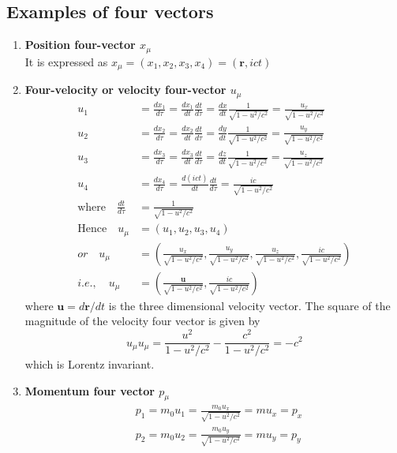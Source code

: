 \subsection{Examples of four vectors}
\begin{enumerate}
	\item \textbf{ Position four-vector $ x_{\mu}$}\\
	It is expressed as $x_{\mu}=\left(x_{1}, x_{2}, x_{3}, x_{4}\right)=(\mathbf{r}, i c t)$
	\item \textbf{ Four-velocity or velocity four-vector $u_{\mu}$}\\
	\begin{align*}
		u_{1}&=\frac{d x_{1}}{d \tau}=\frac{d x_{1}}{d t} \frac{d t}{d \tau}=\frac{d x}{d t} \frac{1}{\sqrt{1-u^{2} / c^{2}}}=\frac{u_{x}}{\sqrt{1-u^{2} / c^{2}}} \\
		u_{2}&=\frac{d x_{2}}{d \tau}=\frac{d x_{2}}{d t} \frac{d t}{d \tau}=\frac{d y}{d t} \frac{1}{\sqrt{1-u^{2} / c^{2}}}=\frac{u_{y}}{\sqrt{1-u^{2} / c^{2}}} \\
		u_{3}&=\frac{d x_{3}}{d \tau}=\frac{d x_{3}}{d t} \frac{d t}{d \tau}=\frac{d z}{d t} \frac{1}{\sqrt{1-u^{2} / c^{2}}}=\frac{u_{z}}{\sqrt{1-u^{2} / c^{2}}} \\
		u_{4}&=\frac{d x_{4}}{d \tau}=\frac{d(i c t)}{d t} \frac{d t}{d \tau}=\frac{i c}{\sqrt{1-u^{2} / c^{2}}}\\
		\text{where} \quad \frac{d t}{d \tau}&=\frac{1}{\sqrt{1-u^{2} / c^{2}}}\\
		\text{Hence} \quad u_{\mu}&=\left(u_{1}, u_{2}, u_{3}, u_{4}\right)\\
		or \quad u_{\mu}&=\left(\frac{u_{x}}{\sqrt{1-u^{2} / c^{2}}}, \frac{u_{y}}{\sqrt{1-u^{2} / c^{2}}}, \frac{u_{z}}{\sqrt{1-u^{2} / c^{2}}}, \frac{i c}{\sqrt{1-u^{2} / c^{2}}}\right)\\
		i.e., \quad u_{\mu}&=\left(\frac{\mathbf{u}}{\sqrt{1-u^{2} / c^{2}}}, \frac{i c}{\sqrt{1-u^{2} / c^{2}}}\right)
	\end{align*}
	where $\mathbf{u}=d \mathbf{r} / d t$ is the three dimensional velocity vector.
	The square of the magnitude of the velocity four vector is given by
	$$
	u_{\mu} u_{\mu}=\frac{u^{2}}{1-u^{2} / c^{2}}-\frac{c^{2}}{1-u^{2} / c^{2}}=-c^{2}
	$$
	which is Lorentz invariant.
	\item \textbf{ Momentum four vector $p_{\mu}$}
	\begin{align*}
		&p_{1}=m_{0} u_{1}=\frac{m_{0} u_{x}}{\sqrt{1-u^{2} / c^{2}}}=m u_{x}=p_{x} \\
		&p_{2}=m_{0} u_{2}=\frac{m_{0} u_{y}}{\sqrt{1-u^{2} / c^{2}}}=m u_{y}=p_{y} \\

\end{align*}
\end{enumerate}
